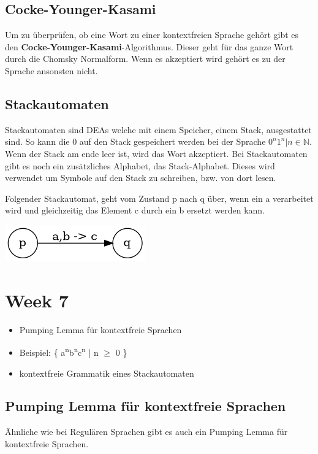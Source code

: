 \documentclass[11pt,twoside,landscape]{article}
\begin{document}
\begin{multicols}{3}
\subsection{Cocke-Younger-Kasami}
\label{sec:orge390718}
Um zu überprüfen, ob eine Wort zu einer kontextfreien Sprache gehört gibt es den \textbf{Cocke-Younger-Kasami}-Algorithmus. Dieser geht für das ganze Wort durch die Chomsky Normalform. Wenn es akzeptiert wird gehört es zu der Sprache ansonsten nicht.

\subsection{Stackautomaten}
\label{sec:orge52e28c}
Stackautomaten sind DEAs welche mit einem Speicher, einem Stack, ausgestattet sind. So kann die 0 auf den Stack gespeichert werden bei der Sprache \({0^n1^n | n \in \mathbb{N}}\). Wenn der Stack am ende leer ist, wird das Wort akzeptiert. Bei Stackautomaten gibt es noch ein zusätzliches Alphabet, das Stack-Alphabet. Dieses wird verwendet um Symbole auf den Stack zu schreiben, bzw. von dort lesen.

Folgender Stackautomat, geht vom Zustand p nach q über, wenn ein a verarbeitet wird und gleichzeitig das Element c durch ein b ersetzt werden kann.
\begin{center}
\includegraphics[width=.9\linewidth]{img/even_zero_dea.png}
\end{center}

\section{Week 7}
\label{sec:org2c2ff6f}
\begin{itemize}
\item Pumping Lemma für kontextfreie Sprachen
\item Beispiel: \{ a\textsuperscript{n}b\textsuperscript{n}c\textsuperscript{n} | n \(\ge\) 0 \}
\item kontextfreie Grammatik eines Stackautomaten
\end{itemize}

\subsection{Pumping Lemma für kontextfreie Sprachen}
\label{sec:orgd552baf}
Ähnliche wie bei Regulären Sprachen gibt es auch ein Pumping Lemma für kontextfreie Sprachen.


\end{multicols}
\end{document}
